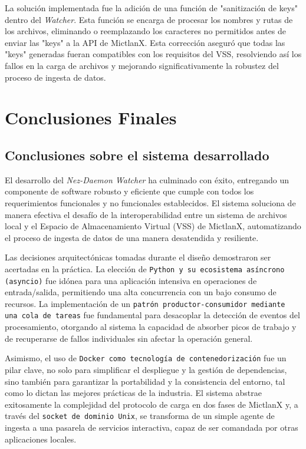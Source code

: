 La solución implementada fue la adición de una función de "sanitización de keys" dentro del \textit{Watcher}. Esta función se encarga de procesar los nombres y rutas de los archivos, eliminando o reemplazando los caracteres no permitidos antes de enviar las "keys" a la API de MictlanX. Esta corrección aseguró que todas las "keys" generadas fueran compatibles con los requisitos del VSS, resolviendo así los fallos en la carga de archivos y mejorando significativamente la robustez del proceso de ingesta de datos.

\section{Conclusiones Finales}

\subsection{Conclusiones sobre el sistema desarrollado}
El desarrollo del \textit{Nez-Daemon Watcher} ha culminado con éxito, entregando un componente de software robusto y eficiente que cumple con todos los requerimientos funcionales y no funcionales establecidos. El sistema soluciona de manera efectiva el desafío de la interoperabilidad entre un sistema de archivos local y el Espacio de Almacenamiento Virtual (VSS) de MictlanX, automatizando el proceso de ingesta de datos de una manera desatendida y resiliente.

Las decisiones arquitectónicas tomadas durante el diseño demostraron ser acertadas en la práctica. La elección de \texttt{Python y su ecosistema asíncrono (asyncio)} fue idónea para una aplicación intensiva en operaciones de entrada/salida, permitiendo una alta concurrencia con un bajo consumo de recursos. La implementación de un \texttt{patrón productor-consumidor mediante una cola de tareas} fue fundamental para desacoplar la detección de eventos del procesamiento, otorgando al sistema la capacidad de absorber picos de trabajo y de recuperarse de fallos individuales sin afectar la operación general.

Asimismo, el uso de \texttt{Docker como tecnología de contenedorización} fue un pilar clave, no solo para simplificar el despliegue y la gestión de dependencias, sino también para garantizar la portabilidad y la consistencia del entorno, tal como lo dictan las mejores prácticas de la industria. El sistema abstrae exitosamente la complejidad del protocolo de carga en dos fases de MictlanX y, a través del \texttt{socket de dominio Unix}, se transforma de un simple agente de ingesta a una pasarela de servicios interactiva, capaz de ser comandada por otras aplicaciones locales.

